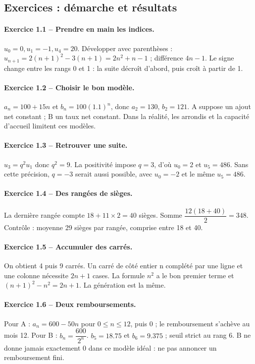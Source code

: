 \subsection*{Exercices : démarche et résultats}
\paragraph{Exercice 1.1 -- Prendre en main les indices.} $u_0=0,u_1=-1,u_4=20$. Développer avec parenthèses : $u_{n+1}=2(n+1)^2-3(n+1)=2n^2+n-1$ ; différence $4n-1$. Le signe change entre les rangs 0 et 1 : la suite décroît d’abord, puis croît à partir de 1.
\paragraph{Exercice 1.2 -- Choisir le bon modèle.} $a_n=100+15n$ et $b_n=100(\num{1,1})^n$, donc $a_2=130$, $b_2=121$. A suppose un ajout net constant ; B un taux net constant. Dans la réalité, les arrondis et la capacité d’accueil limitent ces modèles.
\paragraph{Exercice 1.3 -- Retrouver une suite.} $u_3=q^2u_1$ donc $q^2=9$. La positivité impose $q=3$, d’où $u_0=2$ et $u_5=486$. Sans cette précision, $q=-3$ serait aussi possible, avec $u_0=-2$ et le même $u_5=486$.
\paragraph{Exercice 1.4 -- Des rangées de sièges.} La dernière rangée compte $18+11\times2=40$ sièges. Somme $\dfrac{12(18+40)}{2}=348$. Contrôle : moyenne 29 sièges par rangée, comprise entre 18 et 40.
\paragraph{Exercice 1.5 -- Accumuler des carrés.} On obtient 4 puis 9 carrés. Un carré de côté entier n complété par une ligne et une colonne nécessite $2n+1$ cases. La formule $n^2$ a le bon premier terme et $ (n+1)^2-n^2=2n+1$. La génération est la même.
\paragraph{Exercice 1.6 -- Deux remboursements.} Pour A : $a_n=600-50n$ pour $0\leq n\leq12$, puis 0 ; le remboursement s’achève au mois 12. Pour B : $b_n=\dfrac{600}{2^n}$. $b_5=\num{18,75}$ et $b_6=\num{9,375}$ ; seuil strict au rang 6. B ne donne jamais exactement 0 dans ce modèle idéal : ne pas annoncer un remboursement fini.
